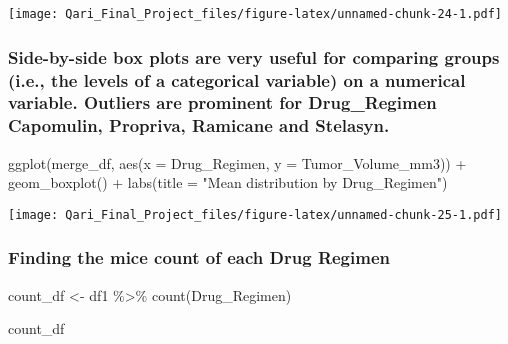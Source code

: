 \documentclass[
]{article}
\newenvironment{Shaded}{\begin{snugshade}}{\end{snugshade}}
\newcommand{\AttributeTok}[1]{\textcolor[rgb]{0.77,0.63,0.00}{#1}}
\newcommand{\FunctionTok}[1]{\textcolor[rgb]{0.00,0.00,0.00}{#1}}
\newcommand{\NormalTok}[1]{#1}
\newcommand{\OtherTok}[1]{\textcolor[rgb]{0.56,0.35,0.01}{#1}}
\newcommand{\SpecialCharTok}[1]{\textcolor[rgb]{0.00,0.00,0.00}{#1}}
\newcommand{\StringTok}[1]{\textcolor[rgb]{0.31,0.60,0.02}{#1}}
\begin{document}
\texttt{[image: Qari\_Final\_Project\_files/figure-latex/unnamed-chunk-24-1.pdf]}

\hypertarget{side-by-side-box-plots-are-very-useful-for-comparing-groups-i.e.-the-levels-of-a-categorical-variable-on-a-numerical-variable.-outliers-are-prominent-for-drug_regimen-capomulin-propriva-ramicane-and-stelasyn.}{%
\subsubsection{Side-by-side box plots are very useful for comparing
groups (i.e., the levels of a categorical variable) on a numerical
variable. Outliers are prominent for Drug\_Regimen Capomulin, Propriva,
Ramicane and
Stelasyn.}\label{side-by-side-box-plots-are-very-useful-for-comparing-groups-i.e.-the-levels-of-a-categorical-variable-on-a-numerical-variable.-outliers-are-prominent-for-drug_regimen-capomulin-propriva-ramicane-and-stelasyn.}}

\begin{Shaded}
\begin{Highlighting}[]
\FunctionTok{ggplot}\NormalTok{(merge\_df, }
       \FunctionTok{aes}\NormalTok{(}\AttributeTok{x =}\NormalTok{ Drug\_Regimen, }
           \AttributeTok{y =}\NormalTok{ Tumor\_Volume\_mm3)) }\SpecialCharTok{+}
  \FunctionTok{geom\_boxplot}\NormalTok{() }\SpecialCharTok{+}
  \FunctionTok{labs}\NormalTok{(}\AttributeTok{title =} \StringTok{"Mean distribution by Drug\_Regimen"}\NormalTok{)}
\end{Highlighting}
\end{Shaded}

\texttt{[image: Qari\_Final\_Project\_files/figure-latex/unnamed-chunk-25-1.pdf]}

\hypertarget{finding-the-mice-count-of-each-drug-regimen}{%
\subsubsection{Finding the mice count of each Drug
Regimen}\label{finding-the-mice-count-of-each-drug-regimen}}

\begin{Shaded}
\begin{Highlighting}[]
\NormalTok{count\_df }\OtherTok{\textless{}{-}}\NormalTok{ df1 }\SpecialCharTok{\%\textgreater{}\%} \FunctionTok{count}\NormalTok{(Drug\_Regimen)}

\NormalTok{count\_df}
\end{Highlighting}
\end{Shaded}
\end{document}
